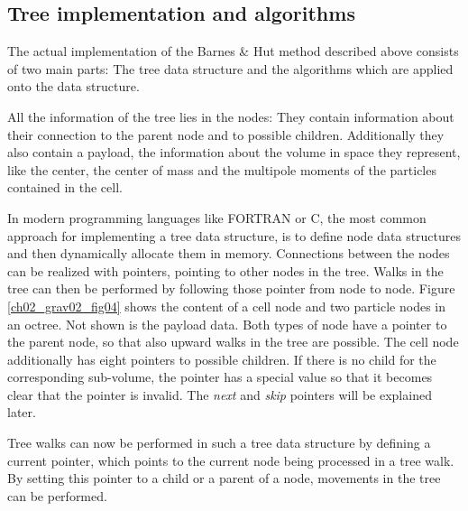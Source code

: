 \subsection{Tree implementation and algorithms}
The actual implementation of the Barnes \& Hut method described above consists of two main parts: The tree data structure and the algorithms which are applied onto the data structure.

All the information of the tree lies in the nodes: They contain information about their connection to the parent node and to possible children. Additionally they also contain a payload, the information about the volume in space they represent, like the center, the center of mass and the multipole moments of the particles contained in the cell. 

In modern programming languages like FORTRAN or C, the most common approach for implementing a tree data structure, is to define node data structures and then dynamically allocate them in memory. Connections between the nodes can be realized with pointers, pointing to other nodes in the tree. Walks in the tree can then be performed by following those pointer from node to node. Figure \ref{ch02_grav02_fig04} shows the content of a cell node and two particle nodes in an octree. Not shown is the payload data. Both types of node have a pointer to the parent node, so that also upward walks in the tree are possible. The cell node additionally has eight pointers to possible children. If there is no child for the corresponding sub-volume, the pointer has a special value so that it becomes clear that the pointer is invalid. The \emph{next} and \emph{skip} pointers will be explained later.

Tree walks can now be performed in such a tree data structure by defining a current pointer, which points to the current node being processed in a tree walk. By setting this pointer to a child or a parent of a node, movements in the tree can be performed. 

